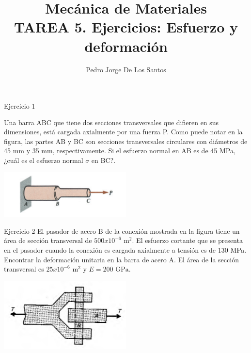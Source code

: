 \documentclass[12pt,letterpaper]{article}
\author{Pedro Jorge De Los Santos}
\title{
{\Large Mecánica de Materiales} \\
{\large TAREA 5. Ejercicios: Esfuerzo y deformación} \\
}
\begin{document}
\maketitle

\begin{ejemplo}{Ejercicio 1}

Una barra ABC que tiene dos secciones transversales que difieren en sus dimensiones, está cargada 
axialmente por una fuerza P. Como puede notar en la figura, las partes AB y BC son secciones 
transversales circulares con diámetros de 45 mm y 35 mm, respectivamente. Si el esfuerzo normal 
en AB es de 45 MPa, ¿cuál es el esfuerzo normal $\sigma$ en BC?.


\begin{center}
\includegraphics[width=0.5\textwidth]{img/problema_axial.PNG}
\end{center}

\end{ejemplo}


\begin{ejemplo}{Ejercicio 2}
El pasador de acero B de la conexión mostrada en la figura tiene un área de sección 
transversal de $500x10^{-6} \text{ m}^2$. El esfuerzo cortante que se presenta en el pasador 
cuando la conexión es cargada axialmente a tensión es de 130 MPa. Encontrar la deformación 
unitaria en la barra de acero A. El área de la sección transversal es $25x10^{-6} \text{ m}^2$ 
y $E=200 \text{ GPa}$.

\begin{center}
\includegraphics[width=0.5\textwidth]{img/problema_cortante_x.PNG}
\end{center}
\end{ejemplo}
\end{document}
